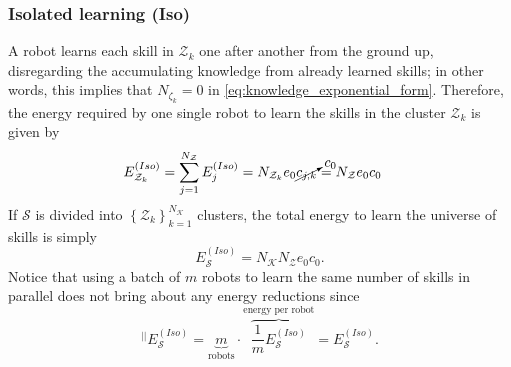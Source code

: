 \subsubsection{\textbf{Isolated learning (Iso)}} A robot learns each skill in $\mathcal{Z}_k$ one after another from the ground up, disregarding the accumulating knowledge from already learned skills; in other words, this implies that $N_{\mathcal{\zeta}_k} = 0$ in \eqref{eq:knowledge_exponential_form}. Therefore, the energy required by one single robot to learn the skills in the cluster $\mathcal{Z}_k$ is given by
 \begin{align}
     \begin{split}
       E^{(Iso)}_{\mathcal{Z}_k} &= \sum_{j=1}^{N_{\mathcal{Z}}} E^{(Iso)}_j= N_{\mathcal{Z}_k}  e_{0} \cancelto{c_{0}}{c_{j,k}} = N_{\mathcal{Z}} e_{0}  c_0
     \end{split}
 \end{align}
If $\mathcal{S}$ is divided into $\left\lbrace \mathcal{Z}_k \right\rbrace^{N_\mathcal{K}}_{k=1} $ clusters, the total energy to learn the universe of skills is simply
\begin{equation}
	E^{(Iso)}_{\mathcal{S}} = N_\mathcal{K} N_{\mathcal{Z}} e_{0}  c_0.
\end{equation}
Notice that using a batch of $m$ robots to learn the same number of skills in parallel does not bring about any energy reductions since
\begin{equation}
    ^{\lvert \lvert}E^{(Iso)}_\mathcal{S}= \underbrace{m}_{\text{robots}}\cdot \overbrace{\frac{1}{m}E^{(Iso)}_\mathcal{S}}^{\text{energy per robot}} = E^{(Iso)}_\mathcal{S}.
\end{equation}



